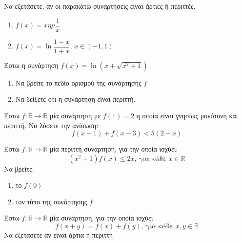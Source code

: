 \documentclass{presentation}
\begin{document}
\begin{askisi}
  Να εξετάσετε, αν οι παρακάτω συναρτήσεις είναι άρτιες ή περιττές.
  \begin{enumerate}
    \item $f(x)=xημ\dfrac{1}{x}$ \pause
    \item $f(x)=\ln \dfrac{1-x}{1+x}$, $x\in (-1,1)$
  \end{enumerate}

\end{askisi}

\begin{askisi}
  Έστω η συνάρτηση $f(x)=\ln (x+\sqrt{x^2+1})$
  \begin{enumerate}
    \item Να βρείτε το πεδίο ορισμού της συνάρτησης $f$ \pause
    \item Να δείξετε ότι η συνάρτηση είναι περιττή.
  \end{enumerate}

\end{askisi}

\begin{askisi}
  Έστω $f:\mathbb{R}\to\mathbb{R}$ μία συνάρτηση με $f(1)=2$ η οποία είναι γνησίως μονότονη και περιττή. Να λύσετε την ανίσωση:
  $$f(x-1)+f(x-3)<5(2-x)$$

\end{askisi}

\begin{askisi}
  Έστω $f:\mathbb{R}\to\mathbb{R}$ μία περιττή συνάρτηση, για την οποία ισχύει:
  $$(x^2+1)f(x)\le 2x \text{, για κάθε } x\in\mathbb{R}$$
  Να βρείτε:
  \begin{enumerate}
    \item το $f(0)$ \pause
    \item τον τύπο της συνάρτησης $f$
  \end{enumerate}

\end{askisi}

\begin{askisi}
  Έστω $f:\mathbb{R}\to\mathbb{R}$ μία συνάρτηση, για την οποία ισχύει
  $$f(x+y)=f(x)+f(y)\text{, για κάθε } x,y\in\mathbb{R}$$
  Να εξετάσετε αν είναι άρτια ή περιττή

\end{askisi}


\moodle
\end{document}
